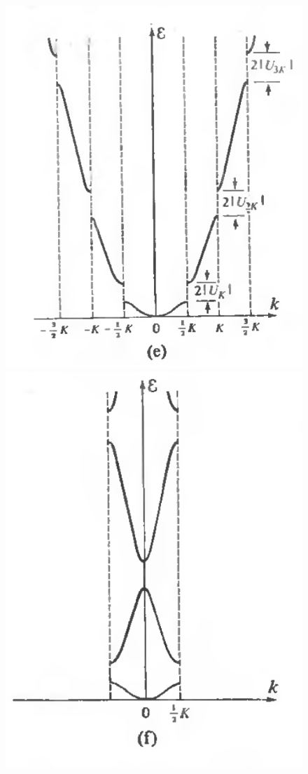 \begin{figure}[htbp]
    \centering
    \includegraphics[scale=0.5]{Images/fig-extendedzonescheme.png}
    \includegraphics[scale=0.5]{Images/fig-reducedzonescheme.png}

\end{figure}
